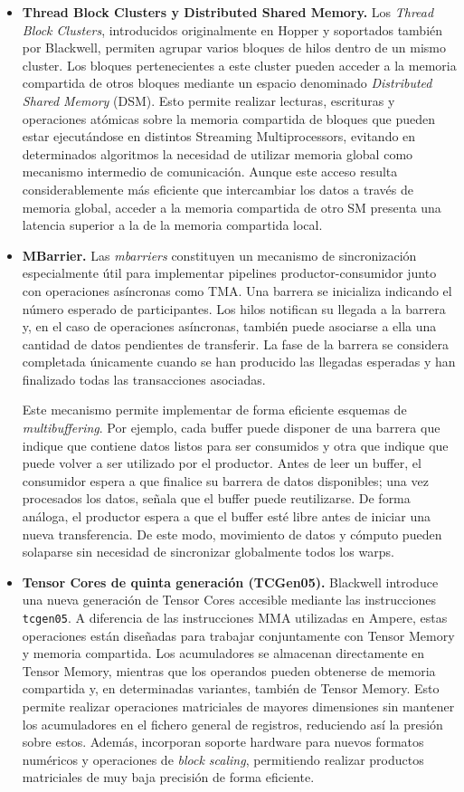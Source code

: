 \begin{itemize}
\item \textbf{Thread Block Clusters y Distributed Shared Memory.}
Los \textit{Thread Block Clusters}, introducidos originalmente en Hopper y soportados también por Blackwell, permiten agrupar varios bloques de hilos dentro de un mismo cluster. Los bloques pertenecientes a este cluster pueden acceder a la memoria compartida de otros bloques mediante un espacio denominado \textit{Distributed Shared Memory} (DSM). Esto permite realizar lecturas, escrituras y operaciones atómicas sobre la memoria compartida de bloques que pueden estar ejecutándose en distintos Streaming Multiprocessors, evitando en determinados algoritmos la necesidad de utilizar memoria global como mecanismo intermedio de comunicación. Aunque este acceso resulta considerablemente más eficiente que intercambiar los datos a través de memoria global, acceder a la memoria compartida de otro SM presenta una latencia superior a la de la memoria compartida local.

\item \textbf{MBarrier.}
Las \textit{mbarriers} constituyen un mecanismo de sincronización especialmente útil para implementar pipelines productor-consumidor junto con operaciones asíncronas como TMA. Una barrera se inicializa indicando el número esperado de participantes. Los hilos notifican su llegada a la barrera y, en el caso de operaciones asíncronas, también puede asociarse a ella una cantidad de datos pendientes de transferir. La fase de la barrera se considera completada únicamente cuando se han producido las llegadas esperadas y han finalizado todas las transacciones asociadas.

Este mecanismo permite implementar de forma eficiente esquemas de \textit{multibuffering}. Por ejemplo, cada buffer puede disponer de una barrera que indique que contiene datos listos para ser consumidos y otra que indique que puede volver a ser utilizado por el productor. Antes de leer un buffer, el consumidor espera a que finalice su barrera de datos disponibles; una vez procesados los datos, señala que el buffer puede reutilizarse. De forma análoga, el productor espera a que el buffer esté libre antes de iniciar una nueva transferencia. De este modo, movimiento de datos y cómputo pueden solaparse sin necesidad de sincronizar globalmente todos los warps.

\item \textbf{Tensor Cores de quinta generación (TCGen05).}
Blackwell introduce una nueva generación de Tensor Cores accesible mediante las instrucciones \texttt{tcgen05}. A diferencia de las instrucciones MMA utilizadas en Ampere, estas operaciones están diseñadas para trabajar conjuntamente con Tensor Memory y memoria compartida. Los acumuladores se almacenan directamente en Tensor Memory, mientras que los operandos pueden obtenerse de memoria compartida y, en determinadas variantes, también de Tensor Memory. Esto permite realizar operaciones matriciales de mayores dimensiones sin mantener los acumuladores en el fichero general de registros, reduciendo así la presión sobre estos. Además, incorporan soporte hardware para nuevos formatos numéricos y operaciones de \textit{block scaling}, permitiendo realizar productos matriciales de muy baja precisión de forma eficiente.


\end{itemize}
